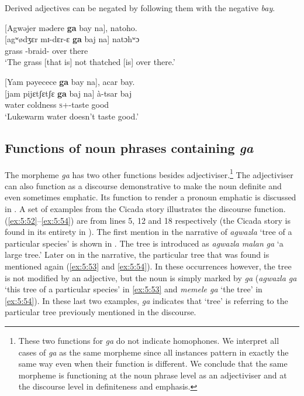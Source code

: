 Derived adjectives can be negated by following them with the negative \textit{bay}. 

\ea \label{ex:5:50}
{}[Agwəjer  mədere  \textbf{ga}  bay   na],  natoho.\\
\gll  {}[agʷødʒɛr  mɪ-dɛr-ɛ  \textbf{ga}  baj  na]  natɔhʷɔ\\
      grass  {\NOM}{}-braid-{\CL}  {\ADJ}  {\NEG}  {\PSP}  {over there}\\
\glt  ‘The grass [that is] not thatched [is] over there.’
\z

\ea \label{ex:5:51}
{}[Yam  pəyecece  \textbf{ga}  bay   na],  acar  bay.\\
\gll  {}[jam  pijɛtʃɛtʃɛ   \textbf{ga}  baj  na]   à-tsar    baj\\
      water  coldness  {\ADJ}  {\NEG}  {\PSP}  {\textsc{s}+{\PFV}-taste good} {\NEG}\\
\glt  ‘Lukewarm water doesn’t taste good.’ 
\z

\subsection{Functions of noun phrases containing \textit{ga}}
\hypertarget{RefHeading1211701525720847}{}
The morpheme \textit{ga} has two other functions besides adjectiviser.\footnote{These two functions for \textit{ga} do not indicate homophones. We interpret all cases of \textit{ga} as the same morpheme since all instances pattern in exactly the same way even when their function is different. We conclude that the same morpheme is functioning at the noun phrase level as an adjectiviser and at the discourse level in definiteness and emphasis.}  The adjectiviser can also function as a discourse demonstrative to make the noun definite and even sometimes emphatic.  Its function to render a pronoun emphatic is discussed in .  A set of examples from the Cicada story illustrates the discourse function. (\ref{ex:5:52}--\ref{ex:5:54}) are from lines 5, 12 and 18 respectively  (the Cicada story is found in its entirety in ). The first mention in the narrative of \textit{agwazla} ‘tree of a particular species’ is shown in . The tree is introduced as \textit{agwazla} \textit{malan} \textit{ga}  ‘a large tree.’ Later on in the narrative, the particular tree that was found is mentioned again (\ref{ex:5:53} and \ref{ex:5:54}). In these occurrences however, the tree is not modified by an adjective, but the noun is simply marked by \textit{ga} (\textit{agwazla ga} ‘this tree of a particular species’ in \ref{ex:5:53} and \textit{memele ga} ‘the tree’ in \ref{ex:5:54}). In these last two examples, \textit{ga} indicates that ‘tree’ is referring to the particular tree previously mentioned in the discourse. 


